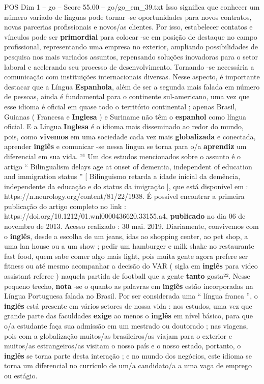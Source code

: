 \begin{textsample}{POS Dim 1 – go – Score 55.00 – go/go\_em\_39.txt}
Isso significa que conhecer um número variado de línguas pode tornar -se oportunidades para novos contratos, novas parcerias profissionais e novos/as clientes.
Por isso, estabelecer contatos e vínculos pode ser \textbf{primordial} para colocar -se em posição de destaque no campo profissional, representando uma empresa no exterior, ampliando possibilidades de pesquisa nos mais variados assuntos, repensando soluções inovadoras para o setor laboral e acelerando seu processo de desenvolvimento.
Tornando -se necessária a comunicação com instituições internacionais diversas.
Nesse aspecto, é importante destacar que a Língua \textbf{Espanhola}, além de ser a segunda mais falada em número de pessoas, ainda é fundamental para o continente sul-americano, uma vez que esse idioma é oficial em quase todo o território continental ; apenas Brasil, Guianas ( Francesa e \textbf{Inglesa} ) e Suriname não têm o \textbf{espanhol} como língua oficial.
E a Língua \textbf{Inglesa} é o idioma mais disseminado ao redor do mundo, pois, como \textbf{vivemos} em uma sociedade cada vez mais \textbf{globalizada} e conectada, aprender \textbf{inglês} e comunicar -se nessa língua se torna para o/a \textbf{aprendiz} um diferencial em sua vida. ²¹ Um dos estudos mencionados sobre o assunto é o artigo “ Bilingualism delays age at onset of dementia, independent of education and immigration status ” [ Bilinguismo retarda a idade inicial da demência, independente da educação e do status da imigração ], que está disponível em : https://n.neurology.org/content/81/22/1938.
É possível encontrar a primeira publicação do artigo completo no link : https://doi.org/10.1212/01.wnl0000436620.33155.a4, \textbf{publicado} no dia 06 de novembro de 2013.
Acesso realizado : 30 mai. 2019.
Diariamente, convivemos com o \textbf{inglês}, desde a escolha de um jeans, idas ao shopping center, ao pet shop, a uma lan house ou a um show ; pedir um hamburger e milk shake no restaurante fast food, quem sabe comer algo mais light, pois muita gente agora prefere ser fitness ou até mesmo acompanhar a decisão do VAR ( sigla em \textbf{inglês} para video assistant referee ) naquela partida de football que a gente \textbf{tanto} gosta²².
Nesse pequeno trecho, \textbf{nota} -se o quanto as palavras em \textbf{inglês} estão incorporadas na Língua Portuguesa falada no Brasil.
Por ser considerada uma “ língua franca ”, o \textbf{inglês} está presente em vários setores de nossa vida : nos estudos, uma vez que grande parte das faculdades \textbf{exige} ao menos o \textbf{inglês} em nível básico, para que o/a estudante faça sua admissão em um mestrado ou doutorado ; nas viagens, pois com a globalização muitos/as brasileiros/as viajam para o exterior e muitos/as estrangeiros/as visitam o nosso país e o nosso estado, portanto, o \textbf{inglês} se torna parte desta interação ; e no mundo dos negócios, este idioma se torna um diferencial no currículo de um/a candidato/a a uma vaga de emprego ou estágio.

\end{textsample}
